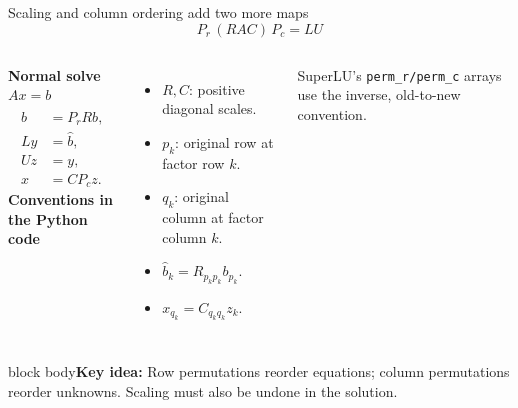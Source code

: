 \documentclass[aspectratio=169,10pt]{beamer}
\newcommand{\takeaway}[1]{\vfill\begin{beamercolorbox}[sep=7pt,wd=\textwidth]{block body}\small\textbf{Key idea:} #1\end{beamercolorbox}}
\begin{document}
\begin{frame}{Scaling and column ordering add two more maps}
\[
 \boxed{\;P_r\,(RAC)\,P_c=LU\;}
\]
\begin{columns}[T,onlytextwidth]
\textbf{Normal solve $Ax=b$}
\begin{align*}
 \widehat b &= P_r Rb,\\
 Ly &= \widehat b,\\
 Uz &= y,\\
 x &= CP_cz.
\end{align*}
\textbf{Conventions in the Python code}
\begin{itemize}\setlength\itemsep{5pt}
\item $R,C$: positive diagonal scales.
\item $p_k$: original row at factor row $k$.
\item $q_k$: original column at factor column $k$.
\item $\widehat b_k=R_{p_kp_k}b_{p_k}$.
\item $x_{q_k}=C_{q_kq_k}z_k$.
\end{itemize}
\small SuperLU's \texttt{perm\_r/perm\_c} arrays use the inverse, old-to-new convention.
\end{columns}
\takeaway{Row permutations reorder equations; column permutations reorder unknowns. Scaling must also be undone in the solution.}
\end{frame}
\end{document}
